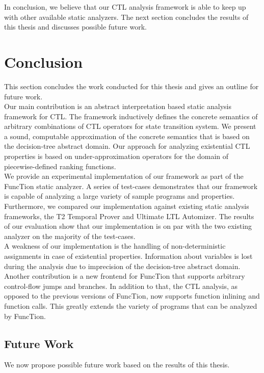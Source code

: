 \documentclass[11pt,a4paper,titlepage]{article}
\theoremstyle{definition}
\begin{document}
In conclusion, we believe that our CTL analysis framework is able to keep up with 
other available static analyzers. The next section concludes the results of this thesis and discusses possible future work.

\pagebreak
\section{Conclusion}\label{sec:conclusion}

This section concludes the work conducted for this thesis and gives an outline for future work.\\

Our main contribution is an abstract interpretation based static analysis framework for CTL.
The framework inductively defines the concrete semantics of arbitrary combinations of CTL operators for state transition system. 
We present a sound, computable approximation of the concrete semantics that is based on the decision-tree abstract domain.
Our approach for analyzing existential CTL properties is based on under-approximation operators 
for the domain of piecewise-defined ranking functions.\\

We provide an experimental implementation of our framework as part of the FuncTion static analyzer. 
A series of test-cases demonstrates that our framework is capable of analyzing a 
large variety of sample programs and properties. Furthermore, we compared our implementation 
against existing static analysis frameworks, the T2 Temporal Prover and Ultimate LTL Automizer.
The results of our evaluation show that our implementation is on par with the two 
existing analyzer on the majority of the test-cases.\\

A weakness of our implementation is the handling of non-deterministic assignments in case of existential properties.
Information about variables is lost during the analysis due to imprecision of the decision-tree abstract domain.\\

Another contribution is a new frontend for FuncTion that supports arbitrary control-flow jumps and branches. 
In addition to that, the CTL analysis, as opposed to the previous versions of FuncTion, 
now supports function inlining and function calls. This greatly extends the variety of programs that can be analyzed by FuncTion.

\subsection{Future Work}
We now propose possible future work based on the results of this thesis.
\end{document}

